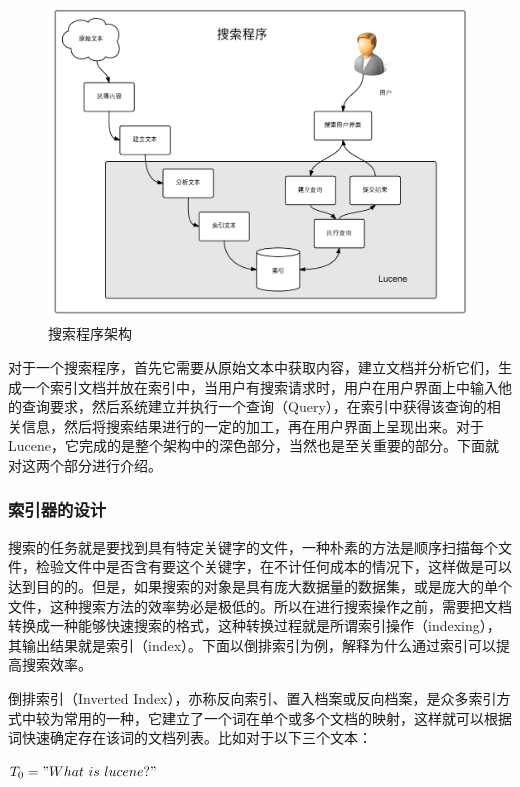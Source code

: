 \documentclass[12pt,a4paper]{article}
\newcommand{\wuhao}{\fontsize{10.5pt}{\baselineskip}\selectfont}
\begin{document}
	\begin{figure}[htbp] 
	\centering\includegraphics[width=5in]{fig/SearchEngineFrame.png} 
	\caption{\wuhao 搜索程序架构}\label{fig:搜索程序架构} 
	\end{figure} 
	
	对于一个搜索程序，首先它需要从原始文本中获取内容，建立文档并分析它们，生成一个索引文档并放在索引中，当用户有搜索请求时，用户在用户界面上中输入他的查询要求，然后系统建立并执行一个查询（{\Times Query}），在索引中获得该查询的相关信息，然后将搜索结果进行的一定的加工，再在用户界面上呈现出来。对于{\Times Lucene}，它完成的是整个架构中的深色部分，当然也是至关重要的部分。下面就对这两个部分进行介绍。	
	
		\subsubsection{索引器的设计}
	搜索的任务就是要找到具有特定关键字的文件，一种朴素的方法是顺序扫描每个文件，检验文件中是否含有要这个关键字，在不计任何成本的情况下，这样做是可以达到目的的。但是，如果搜索的对象是具有庞大数据量的数据集，或是庞大的单个文件，这种搜索方法的效率势必是极低的。所以在进行搜索操作之前，需要把文档转换成一种能够快速搜索的格式，这种转换过程就是所谓索引操作（{\Times indexing}），其输出结果就是索引（{\Times index}）。下面以倒排索引为例，解释为什么通过索引可以提高搜索效率。
	
	倒排索引（{\Times Inverted Index}），亦称反向索引、置入档案或反向档案，是众多索引方式中较为常用的一种，它建立了一个词在单个或多个文档的映射，这样就可以根据词快速确定存在该词的文档列表。比如对于以下三个文本：
	
	$T_0 = "What\ is\ lucene?"$
	
\end{document}
